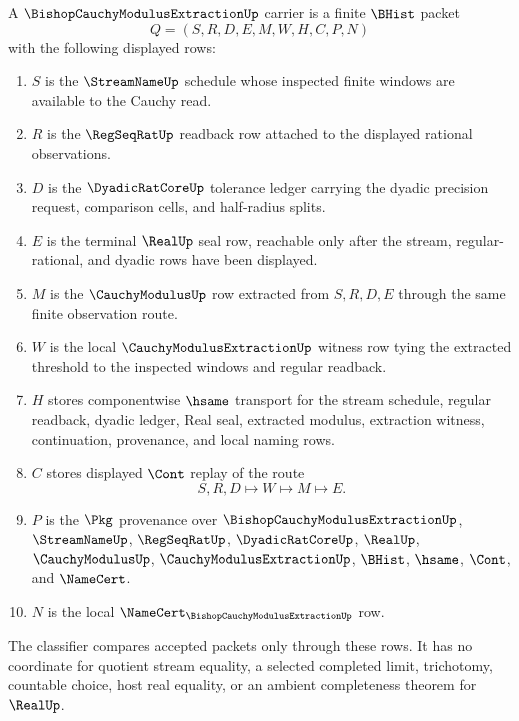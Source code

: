 \begin{definition}
\label{def:bishop-cauchy-modulus-extraction-carrier}
A $\BishopCauchyModulusExtractionUp$ carrier is a finite $\BHist$ packet
$$
Q=(S,R,D,E,M,W,H,C,P,N)
$$
with the following displayed rows:
\begin{enumerate}
\item $S$ is the $\StreamNameUp$ schedule whose inspected finite windows are available to the Cauchy read.
\item $R$ is the $\RegSeqRatUp$ readback row attached to the displayed rational observations.
\item $D$ is the $\DyadicRatCoreUp$ tolerance ledger carrying the dyadic precision request, comparison cells, and half-radius splits.
\item $E$ is the terminal $\RealUp$ seal row, reachable only after the stream, regular-rational, and dyadic rows have been displayed.
\item $M$ is the $\CauchyModulusUp$ row extracted from $S,R,D,E$ through the same finite observation route.
\item $W$ is the local $\CauchyModulusExtractionUp$ witness row tying the extracted threshold to the inspected windows and regular readback.
\item $H$ stores componentwise $\hsame$ transport for the stream schedule, regular readback, dyadic ledger, Real seal, extracted modulus, extraction witness, continuation, provenance, and local naming rows.
\item $C$ stores displayed $\Cont$ replay of the route
$$
S,R,D \longmapsto W \longmapsto M \longmapsto E .
$$
\item $P$ is the $\Pkg$ provenance over $\BishopCauchyModulusExtractionUp$, $\StreamNameUp$, $\RegSeqRatUp$, $\DyadicRatCoreUp$, $\RealUp$, $\CauchyModulusUp$, $\CauchyModulusExtractionUp$, $\BHist$, $\hsame$, $\Cont$, and $\NameCert$.
\item $N$ is the local $\NameCert_{\BishopCauchyModulusExtractionUp}$ row.
\end{enumerate}
The classifier compares accepted packets only through these rows. It has no coordinate for quotient stream equality, a selected completed limit, trichotomy, countable choice, host real equality, or an ambient completeness theorem for $\RealUp$.
\end{definition}

